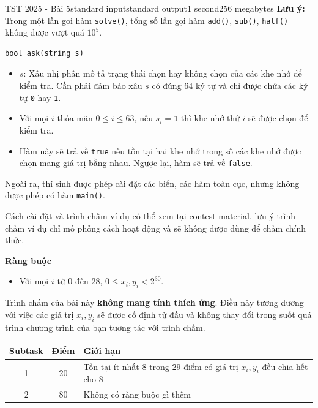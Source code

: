 \begin{problem}{TST 2025 - Bài 5}{standard input}{standard output}{1 second}{256 megabytes}
\textbf{Lưu ý:} Trong một lần gọi hàm \texttt{solve()}, tổng số lần gọi hàm \texttt{add()}, \texttt{sub()}, \texttt{half()} không được vượt quá $10^5$.

\begin{lstlisting}
bool ask(string s)
\end{lstlisting}

\begin{itemize}
   \item $s$: Xâu nhị phân mô tả trạng thái chọn hay không chọn của các khe nhớ để kiểm tra. Cần phải đảm bảo xâu $s$ có đúng $64$ ký tự và chỉ được chứa các ký tự \texttt{0} hay \texttt{1}.
   \item Với mọi $i$ thỏa mãn $0\le i\le 63$, nếu $s_i=$\texttt{1} thì khe nhớ thứ $i$ sẽ được chọn để kiểm tra.
   \item Hàm này sẽ trả về \texttt{true} nếu tồn tại hai khe nhớ trong số các khe nhớ được chọn mang giá trị bằng nhau. Ngược lại, hàm sẽ trả về \texttt{false}.
\end{itemize}

Ngoài ra, thí sinh được phép cài đặt các biến, các hàm toàn cục, nhưng không được phép có hàm \texttt{main()}.

Cách cài đặt và trình chấm ví dụ có thể xem tại contest material, lưu ý trình chấm ví dụ chỉ mô phỏng cách hoạt động và sẽ không được dùng để chấm chính thức.

\textbf{Ràng buộc}

\begin{itemize}
   \item Với mọi $i$ từ $0$ đến $28$, $0\le x_i,y_i<2^{30}$.
\end{itemize}

Trình chấm của bài này \textbf{không mang tính thích ứng}. Điều này tương đương với việc các giá trị $x_i,y_i$ sẽ được cố định từ đầu và không thay đổi trong suốt quá trình chương trình của bạn tương tác với trình chấm.

\Scoring
\begin{center}
  \begin{tabular}{|c|c|l|} \hline
    \textbf{Subtask} & \textbf{Điểm} & \textbf{Giới hạn} \\ \hline
    1 & $20$ & Tồn tại ít nhất $8$ trong $29$ điểm có giá trị $x_i,y_i$ đều chia hết cho $8$ \\ \hline
    2 & $80$ & Không có ràng buộc gì thêm \\ \hline
  \end{tabular}
\end{center}


\end{problem}

